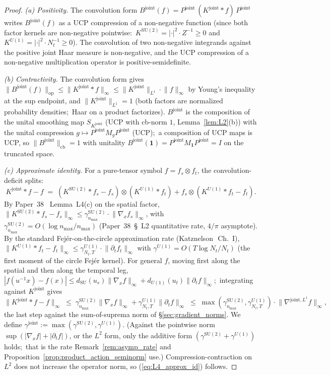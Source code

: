 \documentclass[11pt,a4paper]{article}
\theoremstyle{plain}
\theoremstyle{definition}
\newcommand{\nmax}{n_{\max}}
\newcommand{\Nt}{N_{t}}
\newcommand{\opnorm}[1]{\lVert #1 \rVert_{\mathrm{op}}}
\newcommand{\cbnorm}[1]{\lVert #1 \rVert_{\mathrm{cb}}}
\newcommand{\norm}[1]{\lVert #1 \rVert}
\newcommand{\SU}{\mathrm{SU}}
\newcommand{\Uone}{U(1)}
\newcommand{\Bjoint}{B^{\mathrm{joint}}}
\newcommand{\Pjoint}{P^{\mathrm{joint}}}
\newcommand{\Kjoint}{K^{\mathrm{joint}}}
\newcommand{\KSU}{K^{\SU(2)}}
\newcommand{\KU}{K^{\Uone}}
\newcommand{\gammajoint}{\gamma^{\mathrm{joint}}}
\newcommand{\gammaSU}{\gamma^{\SU(2)}}
\newcommand{\gammaU}{\gamma^{\Uone}}
\begin{document}
\begin{proof}
\emph{(a) Positivity.} The convolution form
$\Bjoint(f) = \Pjoint\,(\Kjoint \ast f)\,\Pjoint$ writes $\Bjoint(f)$
as a UCP compression of a non-negative function (since both factor
kernels are non-negative pointwise:\ $\KSU = |{\cdot}|^{2} \cdot Z^{-1}
\ge 0$ and $\KU = |{\cdot}|^{2} \cdot \Nt^{-1} \ge 0$). The convolution
of two non-negative integrands against the positive joint Haar measure
is non-negative, and the UCP compression of a non-negative multiplication
operator is positive-semidefinite.

\emph{(b) Contractivity.} The convolution form gives
$\opnorm{\Bjoint(f)} \le \norm{\Kjoint \ast f}_{\infty} \le
\norm{\Kjoint}_{L^{1}} \cdot \norm{f}_{\infty}$ by Young's inequality
at the sup endpoint, and $\norm{\Kjoint}_{L^{1}} = 1$ (both factors
are normalized probability densities;\ Haar on a product factorizes).
$\Bjoint$ is the composition of the unital smoothing map
$S_{\Kjoint}$ (UCP with cb-norm $1$, Lemma~\ref{lem:L2}(b)) with the
unital compression $g \mapsto \Pjoint M_{g} \Pjoint$ (UCP);\ a
composition of UCP maps is UCP, so $\cbnorm{\Bjoint} = 1$ with
unitality $\Bjoint(\mathbf{1}) = \Pjoint M_{\mathbf{1}} \Pjoint = I$
on the truncated space.

\emph{(c) Approximate identity.} For a pure-tensor symbol
$f = f_{s} \otimes f_{t}$, the convolution-deficit splits:
\begin{equation*}
   \Kjoint \ast f - f
   \;=\; (\KSU \ast f_{s} - f_{s}) \otimes (\KU \ast f_{t})
       + f_{s} \otimes (\KU \ast f_{t} - f_{t}).
\end{equation*}
By Paper~38~\cite{paper38} Lemma~L4(c) on the spatial factor,
$\norm{\KSU \ast f_{s} - f_{s}}_{\infty} \le \gammaSU_{\nmax} \cdot
\norm{\nabla_{x} f_{s}}_{\infty}$, with $\gammaSU_{\nmax} =
O(\log\nmax / \nmax)$ (Paper~38~\S~L2 quantitative rate, $4/\pi$
asymptote). By the standard Fej\'er-on-the-circle approximation rate
(Katznelson~\cite{katznelson2004}\,Ch.~I), $\norm{\KU \ast f_{t} -
f_{t}}_{\infty} \le \gammaU_{\Nt, T} \cdot \norm{\partial_{t}
f_{t}}_{\infty}$ with $\gammaU = O(T\log\Nt/\Nt)$ (the first moment
of the circle Fej\'er kernel). For general $f$, moving
first along the spatial and then along the temporal leg,
$|f(u^{-1}x) - f(x)| \le d_{\SU}(u_s)\norm{\nabla_x f}_\infty +
d_{\Uone}(u_t)\norm{\partial_t f}_\infty$;\ integrating against $\Kjoint$
gives
\begin{equation*}
   \norm{\Kjoint \ast f - f}_{\infty}
   \;\le\; \gammaSU_{\nmax}\norm{\nabla_x f}_\infty
          + \gammaU_{\Nt, T}\norm{\partial_t f}_\infty
   \;\le\; \max(\gammaSU_{\nmax}, \gammaU_{\Nt, T}) \cdot
            \norm{\nabla^{\mathrm{joint}, L^{1}} f}_{\infty},
\end{equation*}
the last step against the sum-of-suprema norm of \S\ref{sec:gradient_norms}.
We define $\gammajoint := \max(\gammaSU, \gammaU)$. (Against the pointwise
norm $\sup(|\nabla_x f| + |\partial_t f|)$, or the $L^{2}$ form, only the
additive form
$(\gammaSU + \gammaU)$ holds;\ that is the rate Remark~\ref{rem:asymp_rate}
and Proposition~\ref{prop:product_action_seminorm} use.)
Compression-contraction on $L^{2}$ does not increase the operator norm, so
(\ref{eq:L4_approx_id}) follows.


\end{proof}
\end{document}
